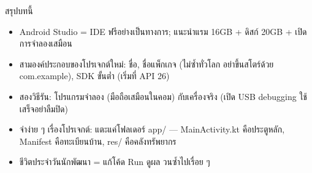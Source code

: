 \begin{tcbsummary}{สรุปบทนี้}
\begin{itemize}
  \item Android Studio = IDE ฟรีอย่างเป็นทางการ; แนะนำแรม 16GB + ดิสก์ 20GB + เปิดการจำลองเสมือน
  \item สามองค์ประกอบของโปรเจกต์ใหม่: ชื่อ, ชื่อแพ็กเกจ (ไม่ซ้ำทั่วโลก อย่าขึ้นสโตร์ด้วย com.example), SDK ขั้นต่ำ (เริ่มที่ API 26)
  \item สองวิธีรัน: โปรแกรมจำลอง (มือถือเสมือนในคอม) กับเครื่องจริง (เปิด USB debugging ใช้เสร็จอย่าลืมปิด)
  \item จำง่าย ๆ เรื่องโปรเจกต์: แตะแค่โฟลเดอร์ app/ — MainActivity.kt คือประตูหลัก, Manifest คือทะเบียนบ้าน, res/ คือคลังทรัพยากร
  \item ชีวิตประจำวันนักพัฒนา = แก้โค้ด Run ดูผล วนซ้ำไปเรื่อย ๆ
\end{itemize}

\end{tcbsummary}
